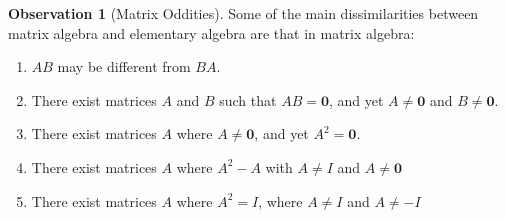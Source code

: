 \documentclass[10pt,]{book}
\theoremstyle{plain}
\theoremstyle{definition}
\theoremstyle{definition}
\newtheorem{observation}[theorem]{Observation}
\theoremstyle{definition}
\theoremstyle{definition}
\begin{document}
\begin{observation}[Matrix Oddities]\label{ss-matrix-oddities}
Some of the main dissimilarities between matrix algebra and elementary algebra are that in matrix algebra:%
\par
\leavevmode%
\begin{enumerate}[label=\arabic*]
\item\hypertarget{li-102}{} \(A B\) may be different from \(B A\).%
\item\hypertarget{li-103}{} There exist matrices \(A\) and \(B\) such that \(A B = \pmb{0}\), and yet \(A\neq \pmb{0}\) and \(B\neq \pmb{0}\).%
\item\hypertarget{li-104}{} There exist matrices \(A\) where \(A \neq  \pmb{0}\), and yet \(A^2 = \pmb{0}\).%
\item\hypertarget{li-105}{} There exist matrices \(A\) where \(A^2-A\) with \(A\neq I\) and \(A\neq \pmb{0}\)%
\item\hypertarget{li-106}{} There exist matrices \(A\) where \(A^2=I\), where \(A\neq I\) and \(A\neq -I\)%
\end{enumerate}
%
\end{observation}
\typeout{************************************************}
\typeout{************************************************}
\end{document}
